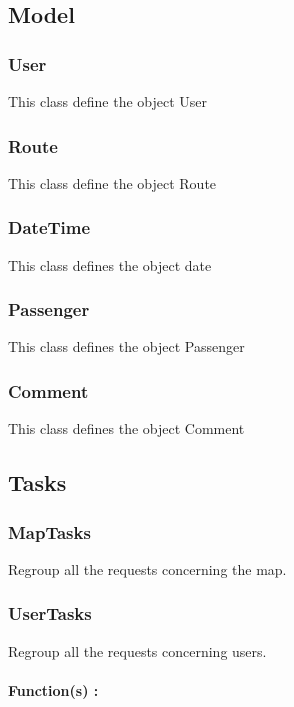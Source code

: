\subsection{Model}

\subsubsection{User}

This class define the object User

\subsubsection{Route}

This class define the object Route

\subsubsection{DateTime}

This class defines the object date

\subsubsection{Passenger}

This class defines the object Passenger

\subsubsection{Comment}

This class defines the object Comment

\subsection{Tasks}

\subsubsection{MapTasks}

Regroup all the requests concerning the map.

\subsubsection{UserTasks}

Regroup all the requests concerning users.
\\\\
\textbf{Function(s) :}

